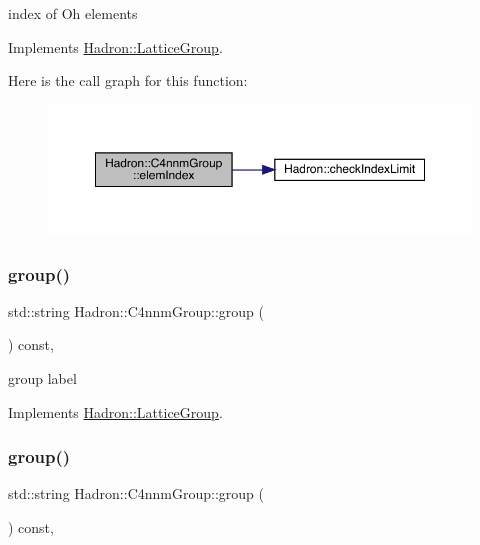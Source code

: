 index of Oh elements 

Implements \mbox{\hyperlink{structHadron_1_1LatticeGroup_afb8e3ee60de059f75bce1044c694e1e8}{Hadron\+::\+Lattice\+Group}}.

Here is the call graph for this function\+:
\nopagebreak
\begin{figure}[H]
\begin{center}
\leavevmode
\includegraphics[width=350pt]{d1/dba/structHadron_1_1C4nnmGroup_a8cbcb161ddf801e759797f231db35f75_cgraph}
\end{center}
\end{figure}
\mbox{\label{structHadron_1_1C4nnmGroup_a9f35739dbd3ad6effd0e675d40b5341d}} 
\subsubsection{\texorpdfstring{group()}{group()}\hspace{0.1cm}{\footnotesize\ttfamily [1/2]}}
{\footnotesize\ttfamily std\+::string Hadron\+::\+C4nnm\+Group\+::group (\begin{DoxyParamCaption}{ }\end{DoxyParamCaption}) const\hspace{0.3cm}{\ttfamily [inline]}, {\ttfamily [virtual]}}

group label 

Implements \mbox{\hyperlink{structHadron_1_1LatticeGroup_a82208a322bf1b1db489f16af38e70087}{Hadron\+::\+Lattice\+Group}}.

\mbox{\label{structHadron_1_1C4nnmGroup_a9f35739dbd3ad6effd0e675d40b5341d}} 
\subsubsection{\texorpdfstring{group()}{group()}\hspace{0.1cm}{\footnotesize\ttfamily [2/2]}}
{\footnotesize\ttfamily std\+::string Hadron\+::\+C4nnm\+Group\+::group (\begin{DoxyParamCaption}{ }\end{DoxyParamCaption}) const\hspace{0.3cm}{\ttfamily [inline]}, {\ttfamily [virtual]}}

